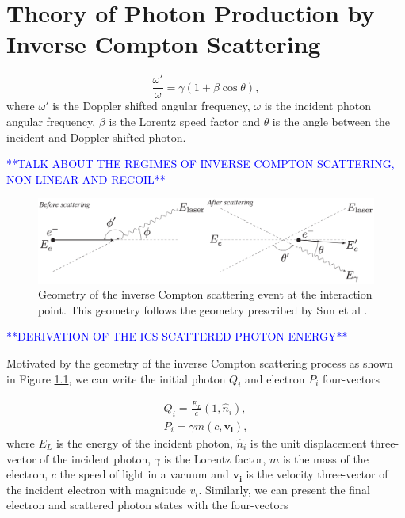 \documentclass[../main.tex]{subfiles}
\begin{document}
\chapter{Theory of Photon Production by Inverse Compton Scattering}
\label{Theory_of_Photon_Production_by_Inverse_Compton_Scattering} %

\begin{equation}
\frac{\omega'}{\omega} = \gamma\left(1+\beta\cos\theta\right),
\label{eq:doppler_shift}
\end{equation}
where $\omega'$ is the Doppler shifted angular frequency, $\omega$ is the incident photon angular frequency, $\beta$ is the Lorentz speed factor and $\theta$ is the angle between the incident and Doppler shifted photon. 

\textcolor{blue}{**TALK ABOUT THE REGIMES OF INVERSE COMPTON SCATTERING, NON-LINEAR AND RECOIL**}

\begin{figure}[!htb]
    \centering
    \includegraphics[width=\textwidth]{Figures/Theory_of_Photon_Production_by_Inverse_Compton_Scattering/scatteringkinematicsdiagram.pdf}
    \caption{Geometry of the inverse Compton scattering event at the interaction point. This geometry follows the geometry prescribed by Sun et al \cite{sun2009energy}. }
    \label{fig:scattered_photon_kinematics}
\end{figure}

\textcolor{blue}{**DERIVATION OF THE ICS SCATTERED PHOTON ENERGY**\\}

Motivated by the geometry of the inverse Compton scattering process as shown in Figure \ref{fig:scattered_photon_kinematics}, we can write the initial photon $Q_{i}$ and electron $P_{i}$ four-vectors

\begin{align}
Q_{i} = \frac{E_{L}}{c}\left(1,\hat{n}_{i}\right), \\
P_{i} = \gamma m\left(c,\boldsymbol{v_{i}}\right),
\label{eq:initial_four_vectors}
\end{align}
where $E_{L}$ is the energy of the incident photon, $\hat{n}_{i}$ is the unit displacement three-vector of the incident photon, $\gamma$ is the Lorentz factor, $m$ is the mass of the electron, $c$ the speed of light in a vacuum and $\boldsymbol{v_{i}}$ is the velocity three-vector of the incident electron with magnitude $v_{i}$. Similarly, we can present the final electron and scattered photon states with the four-vectors 
\end{document}
